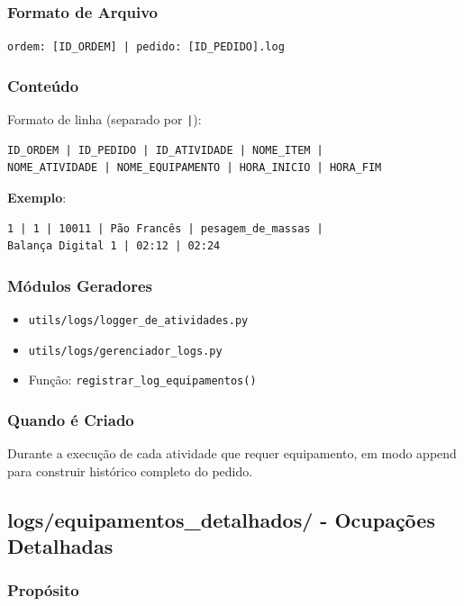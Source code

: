 \documentclass[11pt,a4paper]{article}
\begin{document}
\subsubsection{Formato de Arquivo}

\texttt{ordem: [ID\_ORDEM] | pedido: [ID\_PEDIDO].log}

\subsubsection{Conteúdo}

Formato de linha (separado por \texttt{|}):
\begin{verbatim}
ID_ORDEM | ID_PEDIDO | ID_ATIVIDADE | NOME_ITEM |
NOME_ATIVIDADE | NOME_EQUIPAMENTO | HORA_INICIO | HORA_FIM
\end{verbatim}

\textbf{Exemplo}:
\begin{verbatim}
1 | 1 | 10011 | Pão Francês | pesagem_de_massas |
Balança Digital 1 | 02:12 | 02:24
\end{verbatim}

\subsubsection{Módulos Geradores}

\begin{itemize}
    \item \texttt{utils/logs/logger\_de\_atividades.py}
    \item \texttt{utils/logs/gerenciador\_logs.py}
    \item Função: \texttt{registrar\_log\_equipamentos()}
\end{itemize}

\subsubsection{Quando é Criado}

Durante a execução de cada atividade que requer equipamento, em modo append para construir histórico completo do pedido.

\subsection{logs/equipamentos\_detalhados/ - Ocupações Detalhadas}

\subsubsection{Propósito}
\end{document}
